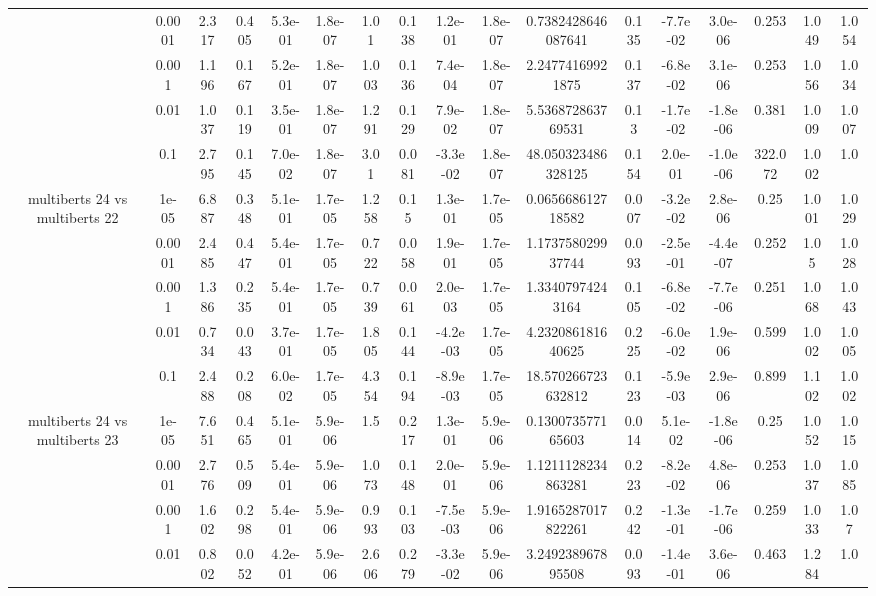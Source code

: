 \begin{tabular}{|c|c|c|c|c|c|c|c|c|c|c|c|c|c|c|c|c|}
 & 0.0001 & 2.317 & 0.405 & 5.3e-01 & 1.8e-07 & 1.01 & 0.138 & 1.2e-01 & 1.8e-07 & 0.7382428646087641 & 0.135 & -7.7e-02 & 3.0e-06 & 0.253 & 1.049 & 1.054 \\
 & 0.001 & 1.196 & 0.167 & 5.2e-01 & 1.8e-07 & 1.003 & 0.136 & 7.4e-04 & 1.8e-07 & 2.24774169921875 & 0.137 & -6.8e-02 & 3.1e-06 & 0.253 & 1.056 & 1.034 \\
 & 0.01 & 1.037 & 0.119 & 3.5e-01 & 1.8e-07 & 1.291 & 0.129 & 7.9e-02 & 1.8e-07 & 5.536872863769531 & 0.13 & -1.7e-02 & -1.8e-06 & 0.381 & 1.009 & 1.007 \\
 & 0.1 & 2.795 & 0.145 & 7.0e-02 & 1.8e-07 & 3.01 & 0.081 & -3.3e-02 & 1.8e-07 & 48.050323486328125 & 0.154 & 2.0e-01 & -1.0e-06 & 322.072 & 1.002 & 1.0 \\
\hline
\multirow{5}{*}{multiberts 24 vs multiberts 22} & 1e-05 & 6.887 & 0.348 & 5.1e-01 & 1.7e-05 & 1.258 & 0.15 & 1.3e-01 & 1.7e-05 & 0.065668612718582 & 0.007 & -3.2e-02 & 2.8e-06 & 0.25 & 1.001 & 1.029 \\
 & 0.0001 & 2.485 & 0.447 & 5.4e-01 & 1.7e-05 & 0.722 & 0.058 & 1.9e-01 & 1.7e-05 & 1.173758029937744 & 0.093 & -2.5e-01 & -4.4e-07 & 0.252 & 1.05 & 1.028 \\
 & 0.001 & 1.386 & 0.235 & 5.4e-01 & 1.7e-05 & 0.739 & 0.061 & 2.0e-03 & 1.7e-05 & 1.33407974243164 & 0.105 & -6.8e-02 & -7.7e-06 & 0.251 & 1.068 & 1.043 \\
 & 0.01 & 0.734 & 0.043 & 3.7e-01 & 1.7e-05 & 1.805 & 0.144 & -4.2e-03 & 1.7e-05 & 4.232086181640625 & 0.225 & -6.0e-02 & 1.9e-06 & 0.599 & 1.002 & 1.005 \\
 & 0.1 & 2.488 & 0.208 & 6.0e-02 & 1.7e-05 & 4.354 & 0.194 & -8.9e-03 & 1.7e-05 & 18.570266723632812 & 0.123 & -5.9e-03 & 2.9e-06 & 0.899 & 1.102 & 1.002 \\
\hline
\multirow{5}{*}{multiberts 24 vs multiberts 23} & 1e-05 & 7.651 & 0.465 & 5.1e-01 & 5.9e-06 & 1.5 & 0.217 & 1.3e-01 & 5.9e-06 & 0.130073577165603 & 0.014 & 5.1e-02 & -1.8e-06 & 0.25 & 1.052 & 1.015 \\
 & 0.0001 & 2.776 & 0.509 & 5.4e-01 & 5.9e-06 & 1.073 & 0.148 & 2.0e-01 & 5.9e-06 & 1.1211128234863281 & 0.223 & -8.2e-02 & 4.8e-06 & 0.253 & 1.037 & 1.085 \\
 & 0.001 & 1.602 & 0.298 & 5.4e-01 & 5.9e-06 & 0.993 & 0.103 & -7.5e-03 & 5.9e-06 & 1.9165287017822261 & 0.242 & -1.3e-01 & -1.7e-06 & 0.259 & 1.033 & 1.07 \\
 & 0.01 & 0.802 & 0.052 & 4.2e-01 & 5.9e-06 & 2.606 & 0.279 & -3.3e-02 & 5.9e-06 & 3.249238967895508 & 0.093 & -1.4e-01 & 3.6e-06 & 0.463 & 1.284 & 1.0 \\

\end{tabular}
